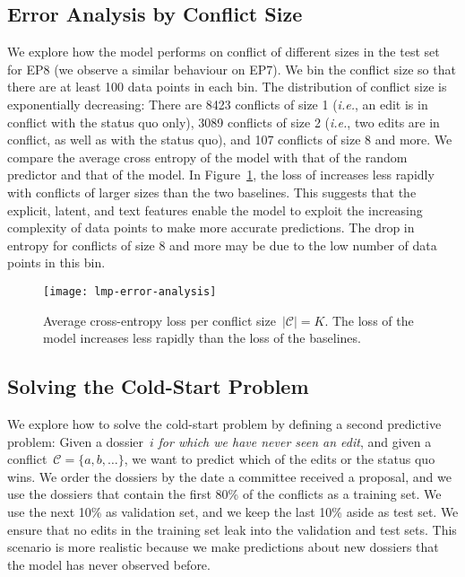 \subsection{Error Analysis by Conflict Size}

We explore how the  model performs on conflict of different sizes in the test set for EP8 (we observe a similar behaviour on EP7).
We bin the conflict size so that there are at least 100 data points in each bin.
The distribution of conflict size is exponentially decreasing:
There are 8423 conflicts of size 1 (\textit{i.e.}, an edit is in conflict with the status quo only), 3089 conflicts of size 2 (\textit{i.e.}, two edits are in conflict, as well as with the status quo),  and 107 conflicts of size 8 and more.
We compare the average cross entropy of the  model with that of the random predictor and that of the \wow{} model.
In Figure~\ref{lmp:fig:error-analysis}, the loss of  increases less rapidly with conflicts of larger sizes than the two baselines.
This suggests that the explicit, latent, and text features enable the model to exploit the increasing complexity of data points to make more accurate predictions.
The drop in entropy for conflicts of size 8 and more may be due to the low number of data points in this bin.

\begin{figure}
  \centering
  \texttt{[image: lmp-error-analysis]}
	\caption{%
		Average cross-entropy loss per conflict size~$\vert \mathcal{C} \vert = K$.
		The loss of the  model increases less rapidly than the loss of the baselines.
	}
	\label{lmp:fig:error-analysis}
\end{figure}

\subsection{Solving the Cold-Start Problem}
\label{lmp:sec:cold-start}

We explore how to solve the cold-start problem by defining a second predictive problem:
Given a dossier~$i$ \textit{for which we have never seen an edit}, and given a conflict~$\mathcal{C} = \{a, b, \ldots \}$, we want to predict which of the edits or the status quo wins.
We order the dossiers by the date a committee received a proposal, and we use the dossiers that contain the first 80\% of the conflicts as a training set.
We use the next 10\% as validation set, and we keep the last 10\% aside as test set.
We ensure that no edits in the training set leak into the validation and test sets.
This scenario is more realistic because we make predictions about new dossiers that the model has never observed before.

